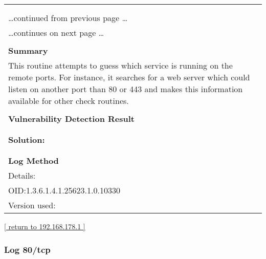 \documentclass{article}
\begin{document}
\begin{longtable}{|p{}|}
\hline
\rowcolor{gvm_log}{\color{white}{Log (CVSS: 0.0) }}\\
\rowcolor{gvm_log}{\color{white}{NVT: Services}}\\
\hline
\endfirsthead
\hfill\ldots continued from previous page \ldots \\
\hline
\endhead
\hline
\ldots continues on next page \ldots \\
\endfoot
\hline
\endlastfoot
\\
\textbf{Summary}\\
This routine attempts to guess which service is running on the
  remote ports. For instance, it searches for a web server which could listen on another port than
  80 or 443 and makes this information available for other check routines.\\

        \hline
        \\
\textbf{Vulnerability Detection Result}\\
\rowcolor{white}{\verb=A web server is running on this port=}\\

          \hline
          \\
\textbf{Solution:}\\
\\


        \hline
        \\
\textbf{Log Method}\\
Details:
\rowcolor{white}{\verb=Services=}\\
OID:1.3.6.1.4.1.25623.1.0.10330\\
Version used:
\rowcolor{white}{\verb=2021-03-15T10:42:03Z=}\\
\end{longtable}

\begin{footnotesize}\hyperref[host:192.168.178.1]{[ return to 192.168.178.1 ]}\end{footnotesize}
\subsubsection{Log 80/tcp}
\label{port:192.168.178.1 80/tcp Log}
\end{document}
